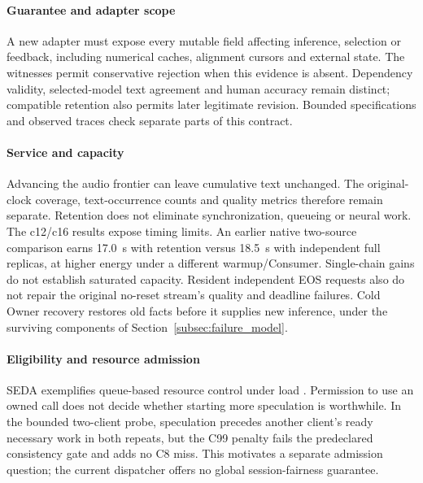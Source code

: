 \paragraph{Guarantee and adapter scope}
A new adapter must expose every mutable field affecting inference,
selection or feedback, including numerical caches, alignment cursors and
external state. The witnesses permit conservative rejection when this
evidence is absent. Dependency validity, selected-model text agreement
and human accuracy remain distinct; compatible retention also permits
later legitimate revision. Bounded specifications and observed traces
check separate parts of this contract.

\paragraph{Service and capacity}
Advancing the audio frontier can leave cumulative text unchanged.
The original-clock coverage, text-occurrence counts and quality metrics
therefore remain separate. Retention does not eliminate synchronization,
queueing or neural work. The c12/c16 results expose timing limits. An
earlier native two-source comparison earns 17.0~s with retention versus
18.5~s with independent full replicas, at higher energy under a different
warmup/Consumer. Single-chain gains do not establish saturated capacity.
Resident independent EOS requests also do not repair the original
no-reset stream's quality and deadline failures. Cold Owner recovery
restores old facts before it supplies new inference, under the surviving
components of Section~\ref{subsec:failure_model}.

\paragraph{Eligibility and resource admission}
SEDA exemplifies queue-based resource control under load
\cite{welsh2001seda}. Permission to use an owned call does not decide whether starting more
speculation is worthwhile. In the bounded two-client probe, speculation
precedes another client's ready necessary work in both repeats, but the
C99 penalty fails the predeclared consistency gate and adds no C8 miss.
This motivates a separate admission question; the current dispatcher
offers no global session-fairness guarantee.
